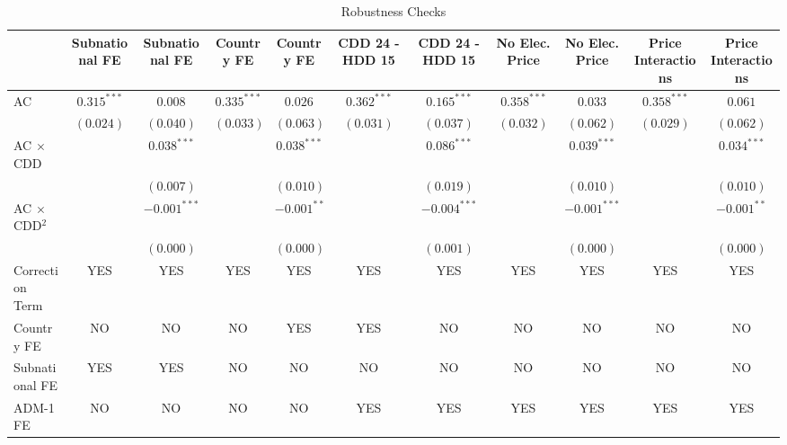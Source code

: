
\begin{table}[H]
\caption{Robustness Checks}
\begin{center}
\begin{tabular}{l c c c c c c c c c c}
\hline
 & Subnational FE & Subnational FE & Country FE & Country FE & CDD 24 - HDD 15 & CDD 24 - HDD 15 & No Elec. Price & No Elec. Price & Price Interactions & Price Interactions \\
\hline
AC                      & $0.315^{***}$ & $0.008$        & $0.335^{***}$ & $0.026$       & $0.362^{***}$ & $0.165^{***}$  & $0.358^{***}$ & $0.033$        & $0.358^{***}$ & $0.061$       \\
                        & $(0.024)$     & $(0.040)$      & $(0.033)$     & $(0.063)$     & $(0.031)$     & $(0.037)$      & $(0.032)$     & $(0.062)$      & $(0.029)$     & $(0.062)$     \\
AC $\times$ CDD         &               & $0.038^{***}$  &               & $0.038^{***}$ &               & $0.086^{***}$  &               & $0.039^{***}$  &               & $0.034^{***}$ \\
                        &               & $(0.007)$      &               & $(0.010)$     &               & $(0.019)$      &               & $(0.010)$      &               & $(0.010)$     \\
AC $\times$ CDD$^2$     &               & $-0.001^{***}$ &               & $-0.001^{**}$ &               & $-0.004^{***}$ &               & $-0.001^{***}$ &               & $-0.001^{**}$ \\
                        &               & $(0.000)$      &               & $(0.000)$     &               & $(0.001)$      &               & $(0.000)$      &               & $(0.000)$     \\
\hline
Correction Term         & YES           & YES            & YES           & YES           & YES           & YES            & YES           & YES            & YES           & YES           \\
Country FE              & NO            & NO             & NO            & YES           & YES           & NO             & NO            & NO             & NO            & NO            \\
Subnational FE          & YES           & YES            & NO            & NO            & NO            & NO             & NO            & NO             & NO            & NO            \\
ADM-1 FE                & NO            & NO             & NO            & NO            & YES           & YES            & YES           & YES            & YES           & YES           \\

\end{tabular}
\end{center}
\end{table}
